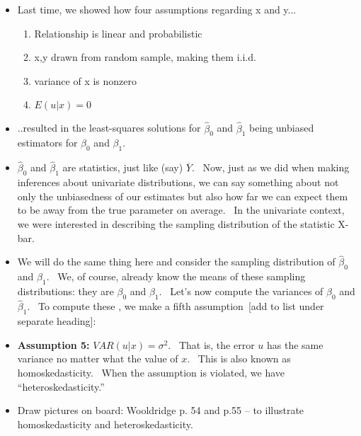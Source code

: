 \documentclass[11pt]{article}
\begin{document}
\begin{itemize}
\item Last time, we showed how four assumptions regarding x and y...

\begin{enumerate}
\item Relationship is linear and probabilistic

\item x,y drawn from random sample, making them i.i.d.

\item variance of x is nonzero

\item $E(u|x)=0$
\end{enumerate}

\item ..resulted in the least-squares solutions for $\widehat{\beta }_{0}$
and $\widehat{\beta }_{1}$ being unbiased estimators for $\beta _{0}$ and $%
\beta _{1}.$

\item $\widehat{\beta }_{0}$ and $\widehat{\beta }_{1}$ are statistics, just
like (say) $\overline{Y}$. \ Now, just as we did when making inferences
about univariate distributions, we can say something about not only the
unbiasedness of our estimates but also how far we can expect them to be away
from the true parameter on average. \ In the univariate context, we were
interested in describing the sampling distribution of the statistic X-bar.

\item We will do the same thing here and consider the sampling distribution
of $\widehat{\beta }_{0}$ and $\widehat{\beta }_{1}.$ \ We, of course,
already know the means of these sampling distributions: they are $\beta _{0}$
and $\beta _{1}.$ \ Let's now compute the variances of $\widehat{\beta }_{0}$
and $\widehat{\beta }_{1}.$ \ To compute these , we make a fifth assumption\
[add to list under separate heading]:

\item \textbf{Assumption 5: }$VAR(u|x)=\sigma ^{2}.$ \ That is, the error $u$
has the same variance no matter what the value of $x$. \ This is also known
as homoskedasticity. \ When the assumption is violated, we have
\textquotedblleft heteroskedasticity.\textquotedblright

\item Draw pictures on board: Wooldridge p. 54 and p.55 -- to illustrate
homoskedasticity and heteroskedasticity.


\end{itemize}
\end{document}
